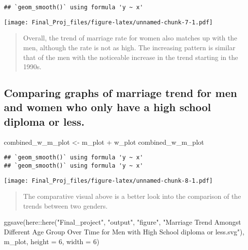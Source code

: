 \documentclass[
]{article}
\newenvironment{Shaded}{\begin{snugshade}}{\end{snugshade}}
\newcommand{\AttributeTok}[1]{\textcolor[rgb]{0.77,0.63,0.00}{#1}}
\newcommand{\DecValTok}[1]{\textcolor[rgb]{0.00,0.00,0.81}{#1}}
\newcommand{\FunctionTok}[1]{\textcolor[rgb]{0.00,0.00,0.00}{#1}}
\newcommand{\NormalTok}[1]{#1}
\newcommand{\OtherTok}[1]{\textcolor[rgb]{0.56,0.35,0.01}{#1}}
\newcommand{\SpecialCharTok}[1]{\textcolor[rgb]{0.00,0.00,0.00}{#1}}
\newcommand{\StringTok}[1]{\textcolor[rgb]{0.31,0.60,0.02}{#1}}
\begin{document}
\begin{verbatim}
## `geom_smooth()` using formula 'y ~ x'
\end{verbatim}

\texttt{[image: Final\_Proj\_files/figure-latex/unnamed-chunk-7-1.pdf]}

\begin{quote}
Overall, the trend of marriage rate for women also matches up with the
men, although the rate is not as high. The increasing pattern is similar
that of the men with the noticeable increase in the trend starting in
the 1990s.
\end{quote}

\hypertarget{comparing-graphs-of-marriage-trend-for-men-and-women-who-only-have-a-high-school-diploma-or-less.}{%
\subsection{Comparing graphs of marriage trend for men and women who
only have a high school diploma or
less.}\label{comparing-graphs-of-marriage-trend-for-men-and-women-who-only-have-a-high-school-diploma-or-less.}}

\begin{Shaded}
\begin{Highlighting}[]
\NormalTok{combined\_w\_m\_plot }\OtherTok{\textless{}{-}}\NormalTok{ m\_plot }\SpecialCharTok{+}\NormalTok{ w\_plot}
\NormalTok{combined\_w\_m\_plot}
\end{Highlighting}
\end{Shaded}

\begin{verbatim}
## `geom_smooth()` using formula 'y ~ x'
## `geom_smooth()` using formula 'y ~ x'
\end{verbatim}

\texttt{[image: Final\_Proj\_files/figure-latex/unnamed-chunk-8-1.pdf]}

\begin{quote}
The comparative visual above is a better look into the comparison of the
trends between two genders.
\end{quote}

\begin{Shaded}
\begin{Highlighting}[]
\FunctionTok{ggsave}\NormalTok{(here}\SpecialCharTok{::}\FunctionTok{here}\NormalTok{(}\StringTok{"Final\_project"}\NormalTok{, }\StringTok{"output"}\NormalTok{, }\StringTok{"figure"}\NormalTok{,}
                  \StringTok{"Marriage Trend Amongst Different Age Group Over Time for Men with High School diploma or less.svg"}\NormalTok{),}
\NormalTok{       m\_plot,}
       \AttributeTok{height =} \DecValTok{6}\NormalTok{,}
       \AttributeTok{width =} \DecValTok{6}\NormalTok{)}
\end{Highlighting}
\end{Shaded}
\end{document}
